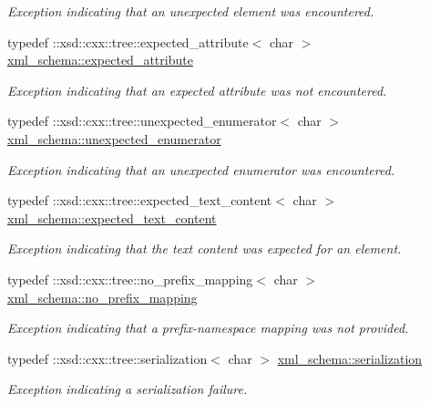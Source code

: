 \begin{DoxyCompactItemize}
\begin{DoxyCompactList}\small\item\em Exception indicating that an unexpected element was encountered. \end{DoxyCompactList}\item 
typedef \+::xsd\+::cxx\+::tree\+::expected\+\_\+attribute$<$ char $>$ \hyperlink{namespacexml__schema_ad8a9d3a09372da61ab6ba78c4de87a26}{xml\+\_\+schema\+::expected\+\_\+attribute}
\begin{DoxyCompactList}\small\item\em Exception indicating that an expected attribute was not encountered. \end{DoxyCompactList}\item 
typedef \+::xsd\+::cxx\+::tree\+::unexpected\+\_\+enumerator$<$ char $>$ \hyperlink{namespacexml__schema_aa088274f605e06cd53d9062265b5229c}{xml\+\_\+schema\+::unexpected\+\_\+enumerator}
\begin{DoxyCompactList}\small\item\em Exception indicating that an unexpected enumerator was encountered. \end{DoxyCompactList}\item 
typedef \+::xsd\+::cxx\+::tree\+::expected\+\_\+text\+\_\+content$<$ char $>$ \hyperlink{namespacexml__schema_a1994323b3f5fee8db7891f02bb9144b9}{xml\+\_\+schema\+::expected\+\_\+text\+\_\+content}
\begin{DoxyCompactList}\small\item\em Exception indicating that the text content was expected for an element. \end{DoxyCompactList}\item 
typedef \+::xsd\+::cxx\+::tree\+::no\+\_\+prefix\+\_\+mapping$<$ char $>$ \hyperlink{namespacexml__schema_a03293581f2c90a05fbb910be49380e01}{xml\+\_\+schema\+::no\+\_\+prefix\+\_\+mapping}
\begin{DoxyCompactList}\small\item\em Exception indicating that a prefix-\/namespace mapping was not provided. \end{DoxyCompactList}\item 
typedef \+::xsd\+::cxx\+::tree\+::serialization$<$ char $>$ \hyperlink{namespacexml__schema_a40e04a11c9e6204762591b4de3755899}{xml\+\_\+schema\+::serialization}
\begin{DoxyCompactList}\small\item\em Exception indicating a serialization failure. \end{DoxyCompactList}\item 

\end{DoxyCompactItemize}
